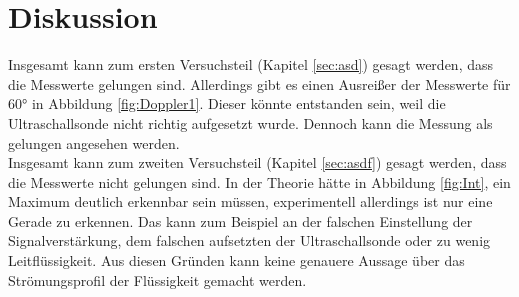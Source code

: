 \section{Diskussion}
\label{sec:Diskussion}
Insgesamt kann zum ersten Versuchsteil (Kapitel \ref{sec:asd}) gesagt werden, dass die Messwerte gelungen sind. Allerdings gibt es einen Ausreißer der Messwerte für 60° in Abbildung \eqref{fig:Doppler1}. Dieser könnte entstanden sein, weil die Ultraschallsonde nicht richtig aufgesetzt wurde. Dennoch kann die Messung als gelungen angesehen werden. \\
Insgesamt kann zum zweiten Versuchsteil (Kapitel \ref{sec:asdf}) gesagt werden, dass die Messwerte nicht gelungen sind. In der Theorie hätte in Abbildung \eqref{fig:Int}, ein Maximum deutlich erkennbar sein müssen, experimentell allerdings ist nur eine Gerade zu erkennen. Das kann zum Beispiel an der falschen Einstellung der Signalverstärkung, dem falschen aufsetzten der Ultraschallsonde oder zu wenig Leitflüssigkeit. Aus diesen Gründen kann keine genauere Aussage über das Strömungsprofil der Flüssigkeit gemacht werden.
